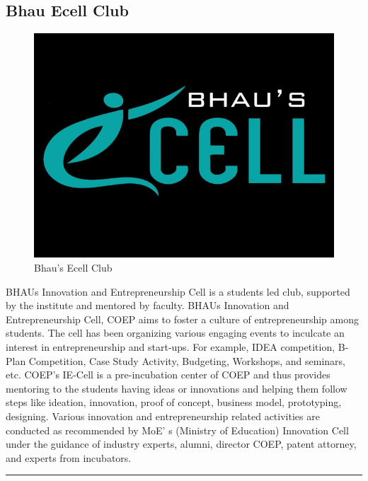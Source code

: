 \documentclass[12pt]{article}
\begin{document}
\subsection{Bhau Ecell Club}
\begin{figure}[h]
   \centering
   \includegraphics[scale=5]{bhaus ecell logo}
   \caption{Bhau's Ecell Club}
   \label{fig3:bhaucell}
\end{figure}
BHAUs Innovation and Entrepreneurship Cell is a students led club, supported by the institute and mentored by faculty. BHAUs Innovation and Entrepreneurship Cell, COEP aims to foster a culture of entrepreneurship among students. The cell has been organizing various engaging events to inculcate an interest in entrepreneurship and start-ups. For example, IDEA competition, B-Plan Competition, Case Study Activity, Budgeting, Workshops, and seminars, etc. COEP's IE-Cell is a pre-incubation center of COEP and thus provides mentoring to the students having ideas or innovations and helping them follow steps like ideation, innovation, proof of concept, business model, prototyping, designing. Various innovation and entrepreneurship related activities are conducted as recommended by MoE' s (Ministry of Education) Innovation Cell under the guidance of industry experts, alumni, director COEP, patent attorney, and experts from incubators.\\
\hrule
\end{document}
